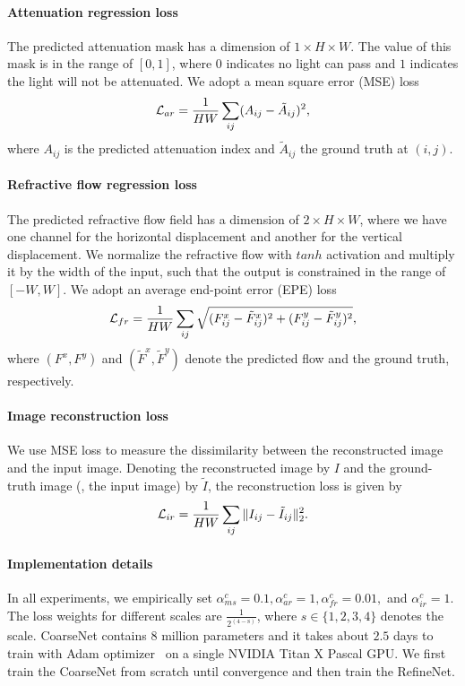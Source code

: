 \paragraph{Attenuation regression loss} 
The predicted attenuation mask has a dimension of  $1\times H\times W$. The value of this mask is in the range of $[0, 1]$, where $0$ indicates no light can pass and $1$ indicates the light will not be attenuated. 
We adopt a mean square error (MSE) loss
\begin{equation}
    \mathcal{L}_{ar} = \frac{1}{HW} \sum_{ij} (A_{ij}-\tilde{A}_{ij})^2,
\end{equation}
where $A_{ij}$ is the predicted attenuation index and $\tilde{A}_{ij}$ the ground truth at $(i, j)$.
\paragraph{Refractive flow regression loss}
\label{par:Disparity Smoothness Loss}
The predicted refractive flow field has a dimension of $2\times H\times W$, where we have one channel for the horizontal displacement and another for the vertical displacement. We normalize the refractive flow with $tanh$ activation and multiply it by the width of the input, such that the output is constrained in the range of $[-W, W]$.
We adopt an average end-point error (EPE) loss
\begin{equation}
    \mathcal{L}_{fr} = \frac{1}{HW} \sum_{ij} \sqrt{(F^x_{ij}-\tilde{F}^x_{ij})^2 + (F^y_{ij}-\tilde{F}^y_{ij})^2},
\end{equation}
where $(F^x, F^y)$ and $(\tilde{F}^x, \tilde{F}^y)$ denote the predicted flow and the ground truth, respectively.

\paragraph{Image reconstruction loss}
\label{par:Image Reconstruction Loss}
We use MSE loss to measure the dissimilarity between the reconstructed image and the input image. 
Denoting the reconstructed image by $I$ and the ground-truth image (\ie, the input image) by $\tilde{I}$, the reconstruction loss is given by
\begin{equation}
    \mathcal{L}_{ir} = \frac{1}{HW} \sum_{ij} \Vert I_{ij}-\tilde{I}_{ij}\Vert_2^2.
\end{equation}

\paragraph{Implementation details}
\label{par:Implementation Details}
In all experiments, we empirically set $\alpha^c_{ms}=0.1, \alpha^c_{ar}=1, \alpha^c_{fr}=0.01,$ and $\alpha^c_{ir}=1$. The loss weights for different scales are $\frac{1}{2^{(4 -\text{s})}}$, where $s \in\{1,2,3,4\}$ denotes the scale. %
CoarseNet contains $8$ million parameters and it takes about $2.5$ days to train with Adam optimizer~\cite{kingma2014adam} on a single NVIDIA Titan X Pascal GPU.  We first train the CoarseNet from scratch until convergence and then train the RefineNet. 

